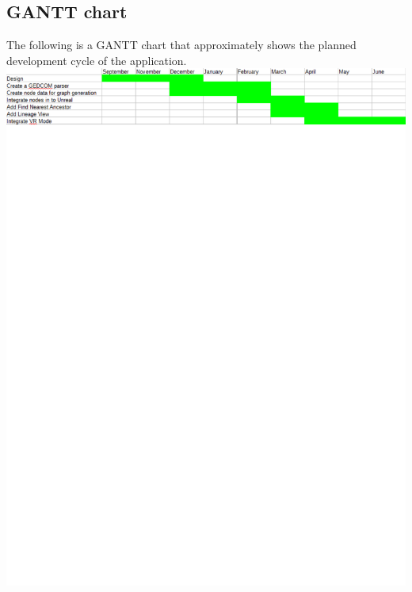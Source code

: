 \documentclass[onecolumn, draftclsnofoot, 10pt, compsoc]{IEEEtran}
\begin{document}
\subsection{GANTT chart}
\begin{singlespace}
The following is a GANTT chart that approximately shows the planned development cycle of the application.
\newline
\newline
\includegraphics[scale=0.8]{GANTT}
\end{singlespace}

\end{document}
